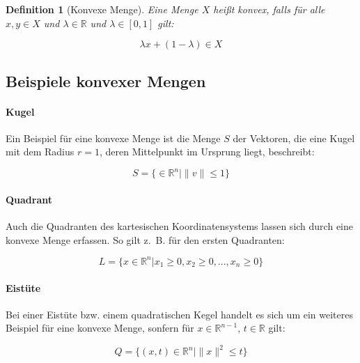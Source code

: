 \documentclass[a4paper]{article}
\newtheorem{Def}{Definition}
\begin{document}
\begin{multicols}{2}

\begin{Def}[Konvexe Menge]

Eine Menge $X$ heißt konvex, falls für alle $x, y \in X$ und $\lambda \in \mathbb{R}$ und $\lambda \in [0,1]$ gilt:

\begin{equation}
\lambda x + (1 - \lambda) \in X
\end{equation}

\end{Def}

\subsection{Beispiele konvexer Mengen}

\paragraph{Kugel}

Ein Beispiel für eine konvexe Menge ist die Menge $S$ der Vektoren, die eine Kugel mit dem Radius $r = 1$, deren Mittelpunkt im Ursprung liegt, beschreibt:

\begin{equation*}
S = \{ \in \mathbb{R}^{n} | \|v\| \le 1\}
\end{equation*}

\paragraph{Quadrant}

Auch die Quadranten des kartesischen Koordinatensystems lassen sich durch eine konvexe Menge erfassen. So gilt z.~B. für den ersten Quadranten:

\begin{equation*}
L = \{ x \in \mathbb{R}^{n} | x_1 \ge 0, x_2 \ge 0, ..., x_n \ge 0\}
\end{equation*}

\paragraph{Eistüte}

Bei einer Eistüte bzw. einem quadratischen Kegel handelt es sich um ein weiteres Beispiel für eine konvexe Menge, sonfern für $x \in \mathbb{R}^{n-1}$, $t \in \mathbb{R}$ gilt:

\begin{equation*}
Q = \{(x, t) \in \mathbb{R}^{n} | \|x\|^{2} \le t\}
\end{equation*}


\end{multicols}
\end{document}
